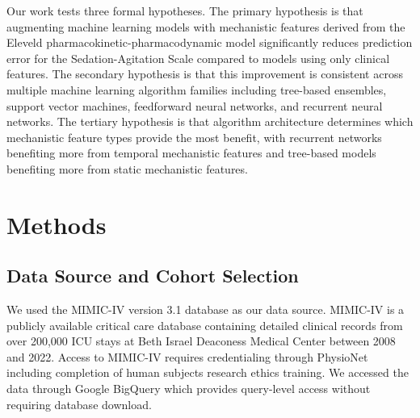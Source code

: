 \documentclass[11pt,a4paper]{article}
\begin{document}
Our work tests three formal hypotheses. The primary hypothesis is that augmenting machine learning models with mechanistic features derived from the Eleveld pharmacokinetic-pharmacodynamic model significantly reduces prediction error for the Sedation-Agitation Scale compared to models using only clinical features. The secondary hypothesis is that this improvement is consistent across multiple machine learning algorithm families including tree-based ensembles, support vector machines, feedforward neural networks, and recurrent neural networks. The tertiary hypothesis is that algorithm architecture determines which mechanistic feature types provide the most benefit, with recurrent networks benefiting more from temporal mechanistic features and tree-based models benefiting more from static mechanistic features.

%

\section{Methods}

\subsection{Data Source and Cohort Selection}

We used the MIMIC-IV version 3.1 database \cite{johnson_mimiciv_2023} as our data source. MIMIC-IV is a publicly available critical care database containing detailed clinical records from over 200,000 ICU stays at Beth Israel Deaconess Medical Center between 2008 and 2022. Access to MIMIC-IV requires credentialing through PhysioNet including completion of human subjects research ethics training. We accessed the data through Google BigQuery which provides query-level access without requiring database download.
\end{document}
